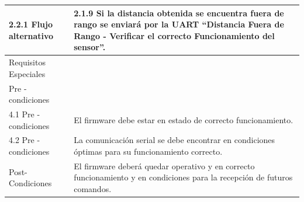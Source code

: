 \begin{table}[H]
\begin{center}
\begin{tabular}{ | m{4cm} | m{9.5cm} | }
2.2.1 Flujo alternativo  & 
2.1.9 Si la distancia obtenida se encuentra fuera de rango se enviará por la UART “Distancia Fuera de Rango - Verificar el correcto Funcionamiento del  sensor”. \\ \hline

Requisitos Especiales & \\ \hline


Pre - condiciones & \\ \hline
 
4.1 Pre - condiciones & 
El firmware debe estar en estado de correcto funcionamiento. \\ \hline

4.2 Pre - condiciones &
La comunicación serial se debe encontrar en condiciones óptimas para su funcionamiento correcto. \\ \hline

Post- Condiciones &
El firmware deberá quedar operativo y en correcto 
funcionamiento y en condiciones para la recepción de futuros comandos. \\ \hline

\end{tabular}

\label{tab:detectar el nivel de agua del canal}
\end{center}
\end{table}

